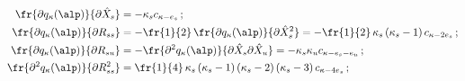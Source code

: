 \begin{align*}

    \fr{\partial q_\kappa (\alp)}{\partial \hat X_s} &= -\kappa_s

    c_{\kappa-e_s}\,;

\\

\fr{\partial q_\kappa (\alp)}{\partial R_{ss}}&= -\fr{1}{2}\,

    \fr{\partial q_\kappa (\alp)}{\partial \hat X_s^2} = -\fr{1}{2}\,\kappa_s 

    \left(\kappa_s-1\right) c_{\kappa- 2 e_s}\,;

  \\

    \fr{\partial q_\kappa (\alp)}{\partial     R_{su}}&= 

    -\fr{\partial^2 q_\kappa (\alp)}{\partial \hat X_s \partial

    \hat X_u} = -\kappa_s \kappa_u c_{\kappa- e_s-e_u}\,;

\\

    \fr{\partial^2 q_\kappa (\alp)}{\partial R_{ss}^2}&= \fr{1}{4}\,\kappa_s

    \left(\kappa_s -1\right) \left(\kappa_s -2\right) 

    \left(\kappa_s-3\right) c_{\kappa- 4e_s}\,;

    \end{align*}

    

    \noindent

